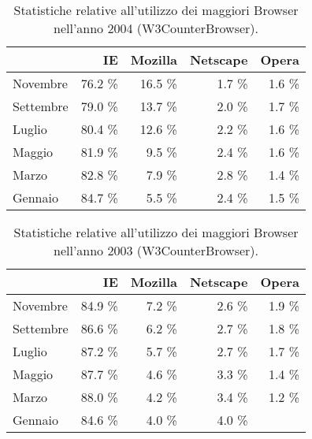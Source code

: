 \begin{table}
\begin{center}
\begin{tabular}{||p{4cm}|*{4}{r|}|}
	\hline
	\centering {\bfseries 2004}  & IE & Mozilla & Netscape & Opera \\
	\hline
	\hline
	Novembre & 76.2 \% &  16.5 \% & 1.7 \% & 1.6 \% \\
	\hline
	Settembre & 79.0 \% &  13.7 \% & 2.0 \% & 1.7 \% \\
	\hline
	Luglio & 80.4 \% & 12.6 \% & 2.2 \% & 1.6 \% \\
	\hline
	Maggio & 81.9 \% & 9.5 \% & 2.4 \% & 1.6 \% \\
	\hline
	Marzo & 82.8 \% & 7.9 \% & 2.8 \% & 1.4 \% \\
	\hline
	Gennaio & 84.7 \% &  5.5 \% & 2.4 \% & 1.5 \% \\
	\hline
\end{tabular}
 \caption{Statistiche relative all'utilizzo dei maggiori Browser nell'anno 2004 (W3CounterBrowser).}
 \label{tab:brow_stats_2004}
\end{center}
\end{table}

\begin{table}
\begin{center}
\begin{tabular}{||p{4cm}|*{4}{r|}|}
	\hline
	\centering {\bfseries 2003}  & IE & Mozilla & Netscape & Opera \\
	\hline
	\hline
	Novembre & 84.9 \% & 7.2 \% & 2.6 \% & 1.9 \% \\
	\hline
	Settembre & 86.6 \% & 6.2 \% & 2.7 \% & 1.8 \% \\
	\hline
	Luglio & 87.2 \% & 5.7 \% & 2.7 \% & 1.7 \% \\
	\hline
	Maggio & 87.7 \% & 4.6 \% & 3.3 \% & 1.4 \% \\
	\hline
	Marzo & 88.0 \% & 4.2 \% & 3.4 \% & 1.2 \% \\
	\hline
	Gennaio & 84.6 \% & 4.0 \% & 4.0 \% &   \\
	\hline
\end{tabular}
 \caption{Statistiche relative all'utilizzo dei maggiori Browser nell'anno 2003 (W3CounterBrowser).}
 \label{tab:brow_stats_2003}
\end{center}
\end{table}

